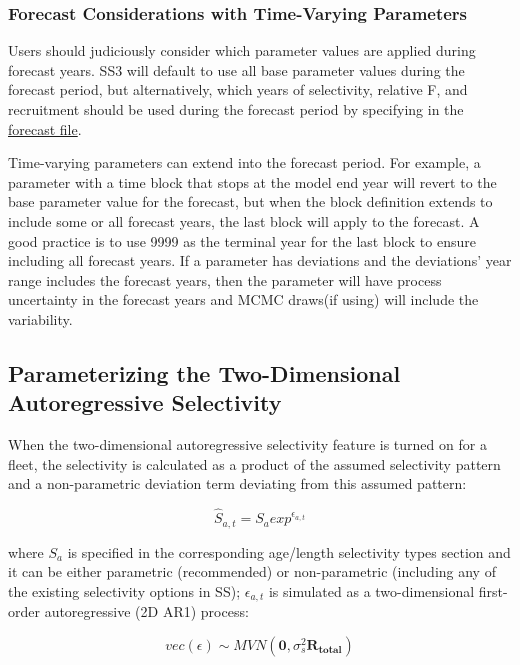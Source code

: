 \subsubsection{Forecast Considerations with Time-Varying Parameters}

Users should judiciously consider which parameter values are applied during forecast years. SS3 will default to use all base parameter values during the forecast period, but alternatively, which years of selectivity, relative F, and recruitment should be used during the forecast period by specifying in the \hyperlink{fore-specify}{forecast file}.

Time-varying parameters can extend into the forecast period. For example, a parameter with a time block that stops at the model end year will revert to the base parameter value for the forecast, but when the block definition extends to include some or all forecast years, the last block will apply to the forecast. A good practice is to use 9999 as the terminal year for the last block to ensure including all forecast years. If a parameter has deviations and the deviations' year range includes the forecast years, then the parameter will have process uncertainty in the forecast years and MCMC draws(if using) will include the variability.


\hypertarget{2DAR}{}
\subsection{Parameterizing the Two-Dimensional Autoregressive Selectivity}
When the two-dimensional autoregressive selectivity feature is turned on for a fleet, the selectivity is calculated as a product of the assumed selectivity pattern and a non-parametric deviation term deviating from this assumed pattern:

\begin{equation}
\hat{S}_{a,t} = S_aexp^{\epsilon_{a,t}}
\end{equation}

where $S_a$ is specified in the corresponding age/length selectivity types section and it can be either parametric (recommended) or non-parametric (including any of the existing selectivity options in SS); $\epsilon_{a,t}$ is simulated as a two-dimensional first-order autoregressive (2D AR1) process:

\begin{equation}
vec(\epsilon) \sim MVN(\mathbf{0},\sigma_s^2\mathbf{R_{total}})
\end{equation}

